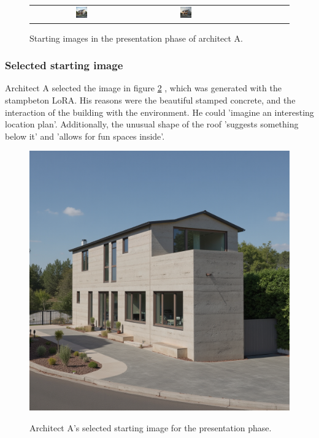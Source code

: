 \begin{figure}[H]
{\begin{tabular}{c c c c c c c c}
    \href{https://github.com/matijspeeters/Thesis/blob/main/Images/Results/Architect-A_Fixed-images/3-presentation/Zonder_lora_00117_.png}{\includegraphics[width=0.12\textwidth]{Images/Results/Architect-A_Fixed-images/3-presentation/Zonder_lora_00117_.png}} &
    \href{https://github.com/matijspeeters/Thesis/blob/main/Images/Results/Architect-A_Fixed-images/3-presentation/Zonder_lora_00121_.png}{\includegraphics[width=0.12\textwidth]{Images/Results/Architect-A_Fixed-images/3-presentation/Zonder_lora_00121_.png}} \\
  \end{tabular}
  }
  \caption{Starting images in the presentation phase of architect A.}
  \label{fig:horizontal-lora-comparison}
\end{figure}

\subsubsection{Selected starting image}
Architect A selected the image in figure \ref{fig:A-presentation-selected} , which was generated with the stampbeton LoRA. His reasons were the beautiful stamped concrete, and the interaction of the building with the environment. He could 'imagine an interesting location plan'. Additionally, the unusual shape of the roof 'suggests something below it' and 'allows for fun spaces inside'.
\begin{figure}[H]
    \centering
    \href{https://github.com/matijspeeters/Thesis/blob/main/Images/Results/Architect-A_Fixed-images/3-presentation/Met_lora_00097_.png}{\includegraphics[width=0.3\linewidth]{Images/Results/Architect-A_Fixed-images/3-presentation/Met_lora_00097_.png}}
    \caption{Architect A's selected starting image for the presentation phase.}
    \label{fig:A-presentation-selected}
\end{figure}

